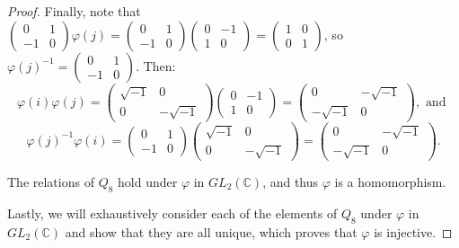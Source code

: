 \documentclass{article}
\begin{document}
\begin{proof}
    Finally, note that $\begin{pmatrix}0 & 1 \\ -1 & 0\end{pmatrix}\varphi(j) = \begin{pmatrix}0 & 1 \\ -1 & 0\end{pmatrix}\begin{pmatrix}0 & -1 \\ 1 & 0\end{pmatrix} = \begin{pmatrix}1 & 0 \\ 0 & 1\end{pmatrix}$, so \newline $\varphi(j)^{-1} = \begin{pmatrix}0 & 1 \\ -1 & 0\end{pmatrix}$. Then:
    \begin{equation*}
        \varphi(i) \varphi(j) = \begin{pmatrix}\sqrt{-1} & 0 \\ 0 & -\sqrt{-1}\end{pmatrix}\begin{pmatrix}0 & -1 \\ 1 & 0\end{pmatrix} = \begin{pmatrix}0 & -\sqrt{-1} \\ -\sqrt{-1} & 0\end{pmatrix}, \text{ and }
    \end{equation*}
    \begin{equation*}
        \varphi(j)^{-1} \varphi(i) = \begin{pmatrix}0 & 1 \\ -1 & 0\end{pmatrix}\begin{pmatrix}\sqrt{-1} & 0 \\ 0 & -\sqrt{-1}\end{pmatrix} = \begin{pmatrix}0 & -\sqrt{-1} \\ -\sqrt{-1} & 0\end{pmatrix}.
    \end{equation*}

    The relations of $Q_8$ hold under $\varphi$ in $GL_2(\mathbb{C})$, and thus $\varphi$ is a homomorphism.

    Lastly, we will exhaustively consider each of the elements of $Q_8$ under $\varphi$ in $GL_2(\mathbb{C})$ and show that they are all unique, which proves that $\varphi$ is injective.


\end{proof}
\end{document}
